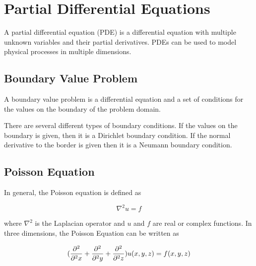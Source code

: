 \section{Partial Differential Equations}

A partial differential equation (PDE) is a differential equation with multiple 
unknown variables and their partial derivatives. PDEs can be used to model physical 
processes in multiple dimensions. 

\subsection{Boundary Value Problem}

A boundary value problem is a differential equation and a set of conditions for
the values on the boundary of the problem domain.

There are several different types of boundary conditions. If the values on the
boundary is given, then it is a Dirichlet boundary condition. If the normal
derivative to the border is given then it is a Neumann boundary
condition\cite{Kreyszig}.

\subsection{Poisson Equation}

In general, the Poisson equation is defined as 

$$\nabla^2 u = f$$

where $\nabla^2$ is the Laplacian operator and $u$ and $f$ are real or complex 
functions. In three dimensions, the Poisson Equation can be written as 

$$(\frac{\partial^2}{\partial^2 x} + \frac{\partial^2}{\partial^2 y} + \frac{\partial^2}{\partial^2 z}) u(x, y, z) = f(x, y, z)$$
